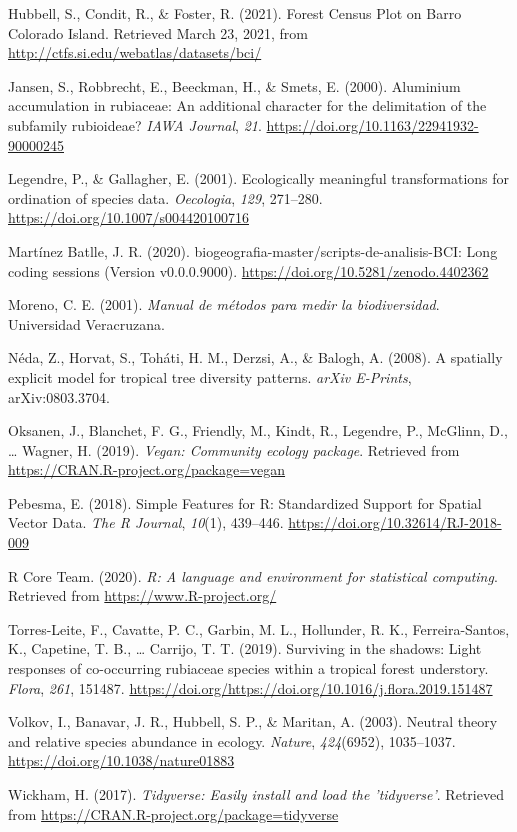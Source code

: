 \documentclass[11pt,]{article}
\begin{document}
\hypertarget{ref-web_bci}{}
Hubbell, S., Condit, R., \& Foster, R. (2021). Forest Census Plot on
Barro Colorado Island. Retrieved March 23, 2021, from
\url{http://ctfs.si.edu/webatlas/datasets/bci/}

\hypertarget{ref-article}{}
Jansen, S., Robbrecht, E., Beeckman, H., \& Smets, E. (2000). Aluminium
accumulation in rubiaceae: An additional character for the delimitation
of the subfamily rubioideae? \emph{IAWA Journal}, \emph{21}.
\url{https://doi.org/10.1163/22941932-90000245}

\hypertarget{ref-legendre_galllagher_2001}{}
Legendre, P., \& Gallagher, E. (2001). Ecologically meaningful
transformations for ordination of species data. \emph{Oecologia},
\emph{129}, 271--280. \url{https://doi.org/10.1007/s004420100716}

\hypertarget{ref-jose_ramon_martinez_batlle_2020_4402362}{}
Martínez Batlle, J. R. (2020).
biogeografia-master/scripts-de-analisis-BCI: Long coding sessions
(Version v0.0.0.9000). \url{https://doi.org/10.5281/zenodo.4402362}

\hypertarget{ref-moreno2001manual}{}
Moreno, C. E. (2001). \emph{Manual de métodos para medir la
biodiversidad}. Universidad Veracruzana.

\hypertarget{ref-2008arXiv0803.3704N}{}
Néda, Z., Horvat, S., Toháti, H. M., Derzsi, A., \& Balogh, A. (2008). A
spatially explicit model for tropical tree diversity patterns.
\emph{arXiv E-Prints}, arXiv:0803.3704.

\hypertarget{ref-cita_vegan}{}
Oksanen, J., Blanchet, F. G., Friendly, M., Kindt, R., Legendre, P.,
McGlinn, D., \ldots{} Wagner, H. (2019). \emph{Vegan: Community ecology
package}. Retrieved from \url{https://CRAN.R-project.org/package=vegan}

\hypertarget{ref-cita_sf}{}
Pebesma, E. (2018). Simple Features for R: Standardized Support for
Spatial Vector Data. \emph{The R Journal}, \emph{10}(1), 439--446.
\url{https://doi.org/10.32614/RJ-2018-009}

\hypertarget{ref-cita_r}{}
R Core Team. (2020). \emph{R: A language and environment for statistical
computing}. Retrieved from \url{https://www.R-project.org/}

\hypertarget{ref-TORRESLEITE2019151487}{}
Torres-Leite, F., Cavatte, P. C., Garbin, M. L., Hollunder, R. K.,
Ferreira-Santos, K., Capetine, T. B., \ldots{} Carrijo, T. T. (2019).
Surviving in the shadows: Light responses of co-occurring rubiaceae
species within a tropical forest understory. \emph{Flora}, \emph{261},
151487.
\url{https://doi.org/https://doi.org/10.1016/j.flora.2019.151487}

\hypertarget{ref-Volkov_2003}{}
Volkov, I., Banavar, J. R., Hubbell, S. P., \& Maritan, A. (2003).
Neutral theory and relative species abundance in ecology. \emph{Nature},
\emph{424}(6952), 1035--1037. \url{https://doi.org/10.1038/nature01883}

\hypertarget{ref-cita_tidyverse}{}
Wickham, H. (2017). \emph{Tidyverse: Easily install and load the
'tidyverse'}. Retrieved from
\url{https://CRAN.R-project.org/package=tidyverse}




\newpage
\singlespacing 
\end{document}
